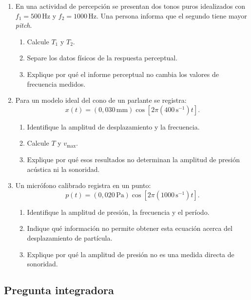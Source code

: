 \begin{enumerate}[label=\textbf{F\arabic*.},leftmargin=*]
    \item En una actividad de percepción se presentan dos tonos puros
    idealizados con \(f_1=500\,\text{Hz}\) y
    \(f_2=1000\,\text{Hz}\). Una persona informa que el segundo tiene mayor
    \emph{pitch}.
    \begin{enumerate}[label=\alph*)]
        \item Calcule \(T_1\) y \(T_2\).
        \item Separe los datos físicos de la respuesta perceptual.
        \item Explique por qué el informe perceptual no cambia los valores de
        frecuencia medidos.
    \end{enumerate}

    \item Para un modelo ideal del cono de un parlante se registra:
    \[
        x(t)=(0{,}030\,\text{mm})
        \cos\left[2\pi(400\,\text{s}^{-1})t\right].
    \]
    \begin{enumerate}[label=\alph*)]
        \item Identifique la amplitud de desplazamiento y la frecuencia.
        \item Calcule \(T\) y \(v_{\max}\).
        \item Explique por qué esos resultados no determinan la amplitud de
        presión acústica ni la sonoridad.
    \end{enumerate}

    \newpage
    \item Un micrófono calibrado registra en un punto:
    \[
        p(t)=(0{,}020\,\text{Pa})
        \cos\left[2\pi(1000\,\text{s}^{-1})t\right].
    \]
    \begin{enumerate}[label=\alph*)]
        \item Identifique la amplitud de presión, la frecuencia y el período.
        \item Indique qué información no permite obtener esta ecuación acerca
        del desplazamiento de partícula.
        \item Explique por qué la amplitud de presión no es una medida directa
        de sonoridad.
    \end{enumerate}
\end{enumerate}

\subsection*{Pregunta integradora}

